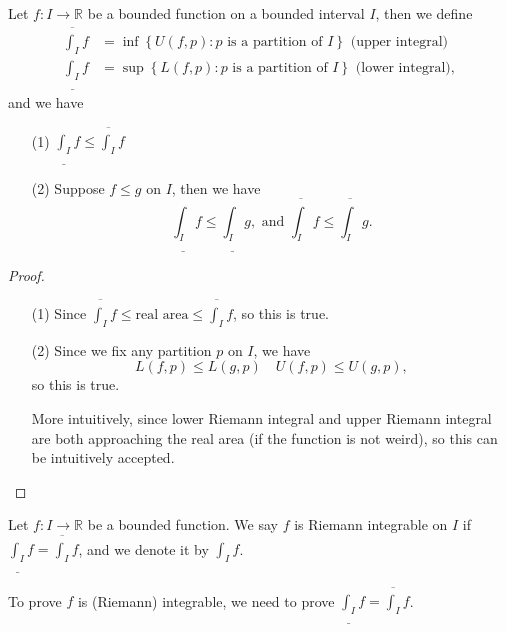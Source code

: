 \begin{proposition}
    Let \(f:I \to \mathbb{R} \) be a bounded function on a bounded interval \(I\), then we define
    \begin{align*}
        \overline{\int _I }f &= \inf \left\{ U(f, p): p \text{ is a partition of } I  \right\} \text{ (upper integral)}  \\
        \underline{\int _I }f &= \sup \left\{ L(f, p): p \text{ is a partition of } I  \right\} \text{ (lower integral)}, 
    \end{align*} and we have 
    \begin{itemize}
        \item [(1)] \(\underline{\int _I} f \le \overline{\int _I} f  \) 
        \item [(2)] Suppose \(f \le g\) on \(I\), then we have 
        \[
            \underline{\int _I}f \le \underline{\int _I}g, \text{ and } \overline{\int _I}f \le \overline{\int _I}g.   
        \]
    \end{itemize}
\end{proposition}
\begin{proof}
    \vphantom{text}
    \begin{itemize}
        \item [(1)] Since \(\overline{\int _I} f \le \text{real area} \le \overline{\int _I} f  \), so this is true. 
        \item [(2)] Since we fix any partition \(p\) on \(I\), we have 
        \[
            L(f, p) \le L(g, p) \quad U(f, p) \le U(g, p),
        \] so this is true.
        \begin{remark}
            More intuitively, since lower Riemann integral and upper Riemann integral are both approaching the real area (if the function is not weird), so this can be intuitively accepted.
        \end{remark}
    \end{itemize}
\end{proof}

\begin{definition} \label{def: Riemann integrable}
    Let \(f:I \to \mathbb{R} \) be a bounded function. We say \(f\) is Riemann integrable on \(I\) if \(\underline{\int _I}f = \overline{\int _I}f \), and we denote it by \(\int _I f\).     
\end{definition}

\begin{remark}
    To prove \(f\) is (Riemann) integrable, we need to prove \(\underline{\int _I} f = \overline{\int _I}f  \).  
\end{remark}

